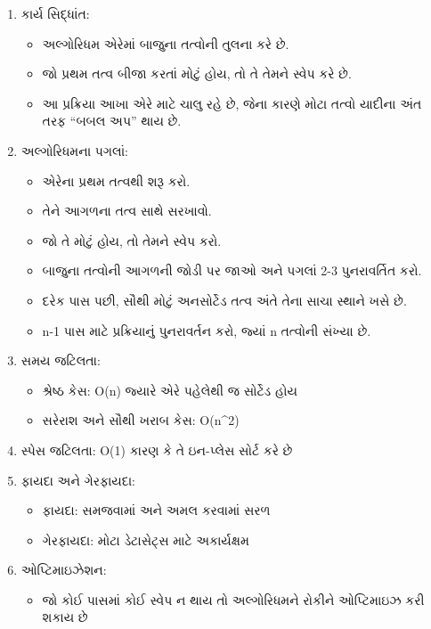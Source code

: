 \begin{enumerate}
\def\labelenumi{\arabic{enumi}.}
\item
  કાર્ય સિદ્ધાંત:

  \begin{itemize}
  \tightlist
  \item
    અલ્ગોરિધમ એરેમાં બાજુના તત્વોની તુલના કરે છે.
  \item
    જો પ્રથમ તત્વ બીજા કરતાં મોટું હોય, તો તે તેમને સ્વેપ કરે છે.
  \item
    આ પ્રક્રિયા આખા એરે માટે ચાલુ રહે છે, જેના કારણે મોટા તત્વો યાદીના અંત તરફ
    ``બબલ અપ'' થાય છે.
  \end{itemize}
\item
  અલ્ગોરિધમના પગલાં:

  \begin{itemize}
  \tightlist
  \item
    એરેના પ્રથમ તત્વથી શરૂ કરો.
  \item
    તેને આગળના તત્વ સાથે સરખાવો.
  \item
    જો તે મોટું હોય, તો તેમને સ્વેપ કરો.
  \item
    બાજુના તત્વોની આગળની જોડી પર જાઓ અને પગલાં 2-3 પુનરાવર્તિત કરો.
  \item
    દરેક પાસ પછી, સૌથી મોટું અનસોર્ટેડ તત્વ અંતે તેના સાચા સ્થાને ખસે છે.
  \item
    n-1 પાસ માટે પ્રક્રિયાનું પુનરાવર્તન કરો, જ્યાં n તત્વોની સંખ્યા છે.
  \end{itemize}
\item
  સમય જટિલતા:

  \begin{itemize}
  \tightlist
  \item
    શ્રેષ્ઠ કેસ: O(n) જ્યારે એરે પહેલેથી જ સોર્ટેડ હોય
  \item
    સરેરાશ અને સૌથી ખરાબ કેસ: O(n\^{}2)
  \end{itemize}
\item
  સ્પેસ જટિલતા: O(1) કારણ કે તે ઇન-પ્લેસ સોર્ટ કરે છે
\item
  ફાયદા અને ગેરફાયદા:

  \begin{itemize}
  \tightlist
  \item
    ફાયદા: સમજવામાં અને અમલ કરવામાં સરળ
  \item
    ગેરફાયદા: મોટા ડેટાસેટ્સ માટે અકાર્યક્ષમ
  \end{itemize}
\item
  ઓપ્ટિમાઇઝેશન:

  \begin{itemize}
  \tightlist
  \item
    જો કોઈ પાસમાં કોઈ સ્વેપ ન થાય તો અલ્ગોરિધમને રોકીને ઓપ્ટિમાઇઝ કરી શકાય છે
  \end{itemize}
\end{enumerate}

